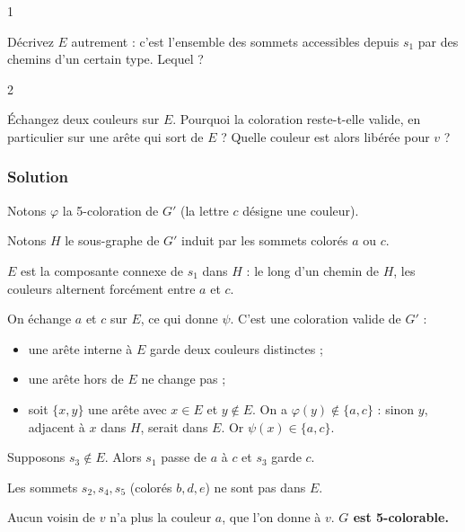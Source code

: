 \documentclass[11pt,a4paper]{article}
\providecommand{\tightlist}{\setlength{\itemsep}{0pt}\setlength{\parskip}{0pt}}
\begin{document}
\begin{indication}{1}

Décrivez \(E\) autrement : c'est l'ensemble des sommets accessibles depuis \(s_1\) par des chemins d'un certain type. Lequel ?

\end{indication}

\begin{indication}{2}

Échangez deux couleurs sur \(E\). Pourquoi la coloration reste-t-elle valide, en particulier sur une arête qui sort de \(E\) ? Quelle couleur est alors libérée pour \(v\) ?

\end{indication}

\hypertarget{solution-40}{%
\subsubsection{Solution}\label{solution-40}}

Notons \(\varphi\) la 5-coloration de \(G'\) (la lettre \(c\) désigne une couleur).

Notons \(H\) le sous-graphe de \(G'\) induit par les sommets colorés \(a\) ou \(c\).

\(E\) est la composante connexe de \(s_1\) dans \(H\) : le long d'un chemin de \(H\), les couleurs alternent forcément entre \(a\) et \(c\).

On échange \(a\) et \(c\) sur \(E\), ce qui donne \(\psi\). C'est une coloration valide de \(G'\) :

\begin{itemize}
\tightlist
\item
  une arête interne à \(E\) garde deux couleurs distinctes ;
\item
  une arête hors de \(E\) ne change pas ;
\item
  soit \(\{x, y\}\) une arête avec \(x \in E\) et \(y \notin E\).
  On a \(\varphi(y) \notin \{a, c\}\) : sinon \(y\), adjacent à \(x\) dans \(H\), serait dans \(E\).
  Or \(\psi(x) \in \{a, c\}\).
\end{itemize}

Supposons \(s_3 \notin E\). Alors \(s_1\) passe de \(a\) à \(c\) et \(s_3\) garde \(c\).

Les sommets \(s_2, s_4, s_5\) (colorés \(b, d, e\)) ne sont pas dans \(E\).

Aucun voisin de \(v\) n'a plus la couleur \(a\), que l'on donne à \(v\). \textbf{\(G\) est 5-colorable.}
\end{document}
